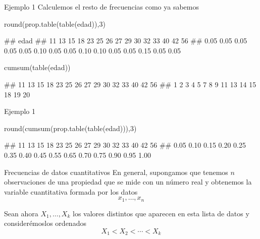 \documentclass[
  ignorenonframetext,
  aspectratio=169]{beamer}
\newenvironment{Shaded}{\begin{snugshade}}{\end{snugshade}}
\newcommand{\DecValTok}[1]{\textcolor[rgb]{0.00,0.00,0.81}{#1}}
\newcommand{\FunctionTok}[1]{\textcolor[rgb]{0.00,0.00,0.00}{#1}}
\newcommand{\NormalTok}[1]{#1}
\let\oldverbatim\verbatim
\let\endoldverbatim\endverbatim
\renewenvironment{verbatim}{\tiny\oldverbatim}{\endoldverbatim}
\begin{document}
\begin{frame}[fragile]{Ejemplo 1}
\protect\hypertarget{ejemplo-1-5}{}
Calculemos el resto de frecuencias como ya sabemos

\begin{Shaded}
\begin{Highlighting}[]
\FunctionTok{round}\NormalTok{(}\FunctionTok{prop.table}\NormalTok{(}\FunctionTok{table}\NormalTok{(edad)),}\DecValTok{3}\NormalTok{)}
\end{Highlighting}
\end{Shaded}

\begin{verbatim}
## edad
##   11   13   15   18   23   25   26   27   29   30   32   33   40   42   56 
## 0.05 0.05 0.05 0.05 0.05 0.10 0.05 0.05 0.10 0.10 0.05 0.05 0.15 0.05 0.05
\end{verbatim}

\begin{Shaded}
\begin{Highlighting}[]
\FunctionTok{cumsum}\NormalTok{(}\FunctionTok{table}\NormalTok{(edad))}
\end{Highlighting}
\end{Shaded}

\begin{verbatim}
## 11 13 15 18 23 25 26 27 29 30 32 33 40 42 56 
##  1  2  3  4  5  7  8  9 11 13 14 15 18 19 20
\end{verbatim}
\end{frame}

\begin{frame}[fragile]{Ejemplo 1}
\protect\hypertarget{ejemplo-1-6}{}
\begin{Shaded}
\begin{Highlighting}[]
\FunctionTok{round}\NormalTok{(}\FunctionTok{cumsum}\NormalTok{(}\FunctionTok{prop.table}\NormalTok{(}\FunctionTok{table}\NormalTok{(edad))),}\DecValTok{3}\NormalTok{)}
\end{Highlighting}
\end{Shaded}

\begin{verbatim}
##   11   13   15   18   23   25   26   27   29   30   32   33   40   42   56 
## 0.05 0.10 0.15 0.20 0.25 0.35 0.40 0.45 0.55 0.65 0.70 0.75 0.90 0.95 1.00
\end{verbatim}
\end{frame}

\begin{frame}{Frecuencias de datos cuantitativos}
\protect\hypertarget{frecuencias-de-datos-cuantitativos-1}{}
En general, supongamos que tenemos \(n\) observaciones de una propiedad
que se mide con un número real y obtenemos la variable cuantitativa
formada por los datos \[x_1,\dots, x_n\]

Sean ahora \(X_1,\dots,X_k\) los valores distintos que aparecen en esta
lista de datos y considerémoslos ordenados \[X_1<X_2<\cdots<X_k\]
\end{frame}
\end{document}
